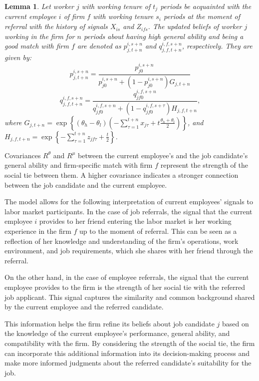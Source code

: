 \documentclass[12pt]{article}
\newtheorem{lemma}{Lemma}
\begin{document}
\begin{lemma}\label{lemma:upd_beliefs_R}
    Let worker $j$ with working tenure of $t_j$ periods be acquainted with the current employee $i$ of firm $f$ with working tenure $s_i$ periods at the moment of referral with the history of signals $X_{is}$ and $Z_{ifs}$. The updated beliefs of worker $j$ working in the firm for $n$ periods about having high general ability and being a good match with firm $f$ are denoted as $p_{j,t+n}^{i,s+n}$ and $q_{j,f,t+n}^{i,f,s+n}$, respectively. They are given by:
    \begin{equation}\label{eq:p_jt_is+t}
        p_{j,t+n}^{i,s+n} = \frac{p_{j0}^{i,s+n}}{p_{j0}^{i,s+n} + (1 - p_{j0}^{i,s+n})G_{j,t+n}}
    \end{equation}
    \begin{equation}\label{eq:q_jt_is+t}
        q_{j,f,t+n}^{i,f,s+n} = \frac{q_{jf0}^{i,f,s+n}}{q_{jf0}^{i,f,s+n} + (1- q_{jf0}^{i,f,s+\tau})H_{j,f,t+n}},
    \end{equation}
    where $G_{j,t+n} = \exp \left\lbrace (\theta_h - \theta_l)(-\sum_{\tau = 1}^{t+n}x_{j\tau} + t\frac{\theta_h + \theta_l}{2}) \right \rbrace$, and $H_{j,f,t+n} = \exp \left\lbrace -\sum_{\tau = 1}^{t+n}z_{jf\tau}+\frac{t}{2}\right\rbrace$.
\end{lemma}

Covariances $R^\theta$ and $R^\mu$ between the current employee's and the job candidate's general ability and firm-specific match with firm $f$ represent the strength of the social tie between them. A higher covariance indicates a stronger connection between the job candidate and the current employee.

The model allows for the following interpretation of current employees' signals to labor market participants. In the case of job referrals, the signal that the current employee $i$ provides to her friend entering the labor market is her working experience in the firm $f$ up to the moment of referral. This can be seen as a reflection of her knowledge and understanding of the firm's operations, work environment, and job requirements, which she shares with her friend through the referral.

On the other hand, in the case of employee referrals, the signal that the current employee provides to the firm is the strength of her social tie with the referred job applicant. This signal captures the similarity and common background shared by the current employee and the referred candidate.

This information helps the firm refine its beliefs about job candidate $j$ based on the knowledge of the current employee's performance, general ability, and compatibility with the firm. By considering the strength of the social tie, the firm can incorporate this additional information into its decision-making process and make more informed judgments about the referred candidate's suitability for the job.
\end{document}
